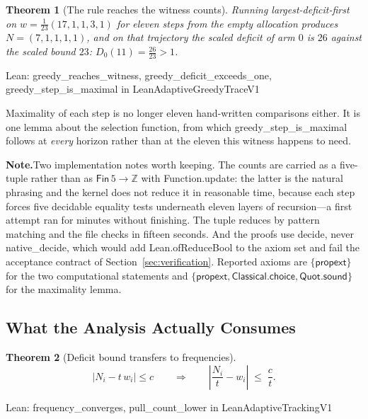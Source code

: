 \documentclass[conference]{IEEEtran}
\newtheorem{theorem}{Theorem}
\theoremstyle{definition}
\newcommand{\lean}[1]{\textsf{\footnotesize #1}}
\newcommand{\leanbox}[1]{%
  \par\vspace{2pt}\noindent
  {\footnotesize\textsf{Lean: #1}}\par\vspace{2pt}}
\newif\ifshownotes\shownotestrue
\newcommand{\NOTEPAR}[1]{\ifshownotes\par\vspace{2pt}\noindent%
  {\color{notecol}\textsf{\footnotesize\textbf{Note.}\;#1}}\par\vspace{2pt}\fi}
\begin{document}
\begin{theorem}[The rule reaches the witness counts]
\label{thm:trace}
Running largest-deficit-first on $w=\tfrac{1}{23}(17,1,1,3,1)$ for eleven steps from the
empty allocation produces $N=(7,1,1,1,1)$, and on that trajectory the scaled deficit of arm
$0$ is $26$ against the scaled bound $23$: $D_{0}(11)=\tfrac{26}{23}>1$.
\end{theorem}

\leanbox{\lean{greedy\_reaches\_witness}, \lean{greedy\_deficit\_exceeds\_one},
\lean{greedy\_step\_is\_maximal} in \lean{LeanAdaptiveGreedyTraceV1}}

Maximality of each step is no longer eleven hand-written comparisons either. It is one lemma
about the selection function, from which \lean{greedy\_step\_is\_maximal} follows at
\emph{every} horizon rather than at the eleven this witness happens to need.

\NOTEPAR{Two implementation notes worth keeping. The counts are carried as a five-tuple
rather than as $\mathsf{Fin}\,5\to\mathbb{Z}$ with \lean{Function.update}: the latter is the
natural phrasing and the kernel does not reduce it in reasonable time, because each step
forces five decidable equality tests underneath eleven layers of recursion---a first attempt
ran for minutes without finishing. The tuple reduces by pattern matching and the file checks
in fifteen seconds. And the proofs use \lean{decide}, never \lean{native\_decide}, which
would add \lean{Lean.ofReduceBool} to the axiom set and fail the acceptance contract of
Section~\ref{sec:verification}. Reported axioms are $\{\textsf{propext}\}$ for the two
computational statements and
$\{\textsf{propext},\textsf{Classical.choice},\textsf{Quot.sound}\}$ for the maximality
lemma.}

\subsection{What the Analysis Actually Consumes}
\label{sec:consumes}

\begin{theorem}[Deficit bound transfers to frequencies]
\label{thm:freq}
\begin{equation}
\bigl|N_{i}-t\,w_{i}\bigr|\leq c
\qquad\Longrightarrow\qquad
\left|\frac{N_{i}}{t}-w_{i}\right|\;\leq\;\frac{c}{t} .
\label{eq:freq}
\end{equation}
\end{theorem}

\leanbox{\lean{frequency\_converges}, \lean{pull\_count\_lower} in
\lean{LeanAdaptiveTrackingV1}}
\end{document}
